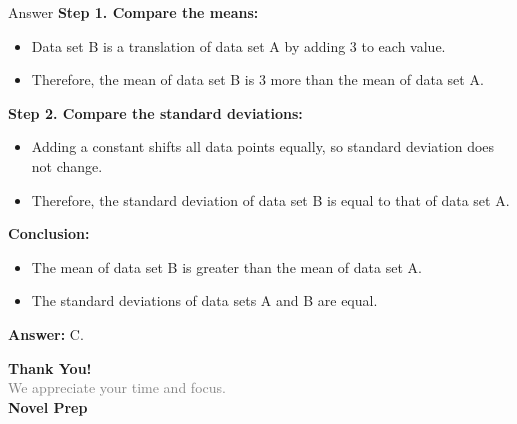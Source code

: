 \documentclass{beamer}
\begin{document}
\begin{frame}{Answer}
\textbf{Step 1. Compare the means:}
\begin{itemize}
    \item Data set B is a translation of data set A by adding 3 to each value.
    \item Therefore, the mean of data set B is 3 more than the mean of data set A.
\end{itemize}

\textbf{Step 2. Compare the standard deviations:}
\begin{itemize}
    \item Adding a constant shifts all data points equally, so standard deviation does not change.
    \item Therefore, the standard deviation of data set B is equal to that of data set A.
\end{itemize}

\textbf{Conclusion:}
\begin{itemize}
    \item The mean of data set B is greater than the mean of data set A.
    \item The standard deviations of data sets A and B are equal.
\end{itemize}

\textbf{Answer:} C.
\end{frame}















\begin{frame}{}

    \centering
    \vspace{5em}

    {\Huge \textbf{\textcolor{novelPurple}{Thank You!}}} \\[1em]
    {\large \textcolor{gray}{We appreciate your time and focus.}} \\[3em]

    {\LARGE \textbf{\textcolor{novelPurple}{\textsf{Novel Prep}}}}

    \vfill
\end{frame}
\end{document}
